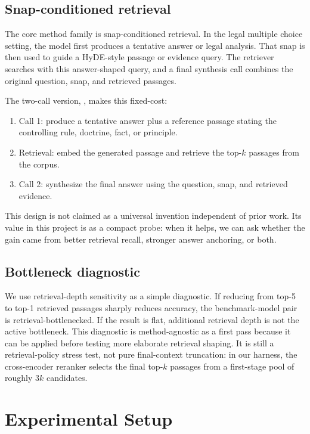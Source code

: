 \documentclass{article}
\newcommand{\method}[1]{\texttt{\detokenize{#1}}}
\begin{document}
\subsection{Snap-conditioned retrieval}

The core method family is snap-conditioned retrieval. In the legal multiple
choice setting, the model first produces a tentative answer or legal analysis.
That snap is then used to guide a HyDE-style passage or evidence query. The
retriever searches with this answer-shaped query, and a final synthesis call
combines the original question, snap, and retrieved passages.

The two-call version, \method{snap_hyde_2call}, makes this fixed-cost:

\begin{enumerate}[leftmargin=*,nosep]
  \item Call 1: produce a tentative answer plus a reference passage stating
  the controlling rule, doctrine, fact, or principle.
  \item Retrieval: embed the generated passage and retrieve the top-$k$
  passages from the corpus.
  \item Call 2: synthesize the final answer using the question, snap, and
  retrieved evidence.
\end{enumerate}

This design is not claimed as a universal invention independent of prior
work. Its value in this project is as a compact probe: when it helps, we can
ask whether the gain came from better retrieval recall, stronger answer
anchoring, or both.

\subsection{Bottleneck diagnostic}

We use retrieval-depth sensitivity as a simple diagnostic. If reducing
\method{rag_simple} from top-5 to top-1 retrieved passages sharply reduces
accuracy, the benchmark-model pair is retrieval-bottlenecked. If the result is
flat, additional retrieval depth is not the active bottleneck. This diagnostic
is method-agnostic as a first pass because it can be applied before testing
more elaborate retrieval shaping. It is still a retrieval-policy stress test,
not pure final-context truncation: in our harness, the cross-encoder reranker
selects the final top-$k$ passages from a first-stage pool of roughly $3k$
candidates.

\section{Experimental Setup}
\end{document}

